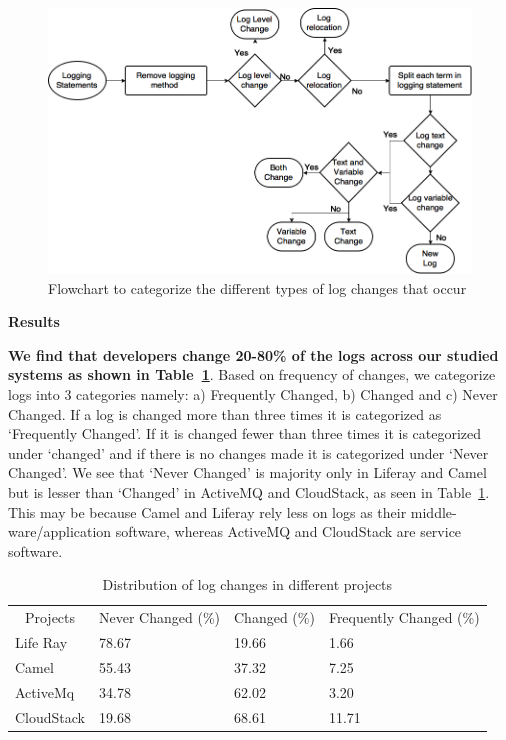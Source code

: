 \begin{figure}[tb]
	\centering
	\includegraphics[width=0.75\linewidth]{Flowchart2v2}
	\caption{Flowchart to categorize the different types of log changes that occur}
	\label{fig:Flowchart2}
\end{figure}


\noindent \textbf{Results}

\textbf{We find that developers change 20-80\% of the logs across our studied systems as shown in Table~\ref{tba:logchangeDistribution}}. Based on frequency of changes, we categorize logs into 3 categories namely: a) Frequently Changed, b) Changed and c) Never Changed. If a log is changed more than three times it is categorized as `Frequently Changed'. If it is changed fewer than three times it is categorized under `changed' and if there is no changes made it is categorized under `Never Changed'. We see that `Never Changed' is majority only in Liferay and Camel but is lesser than `Changed' in ActiveMQ and CloudStack, as seen in Table~\ref{tba:logchangeDistribution}. This may be because Camel and Liferay rely less on logs as their middle-ware/application software, whereas ActiveMQ and CloudStack are service software.


\begin{table}[]
	\centering
	\caption{Distribution of log changes in different projects}
	\label{tba:logchangeDistribution}
	\begin{tabular}{l|lll}
	\cline{1-4}  	\multicolumn{1}{|c}{Projects}    & \multicolumn{1}{|c}{Never Changed (\%) }  &  \multicolumn{1}{|c}{Changed (\%) }	   &  \multicolumn{1}{|c}{Frequently Changed (\%) }\\ \cline{1-4}   

		Life Ray      & 78.67     & 19.66 & 1.66           \\
		
		Camel      & 55.43    & 37.32 & 7.25            \\
		ActiveMq   & 34.78     & 62.02 & 3.20           \\
		CloudStack & 19.68     & 68.61 & 11.71          \\ \cline{1-4}
	\end{tabular}
\end{table}

